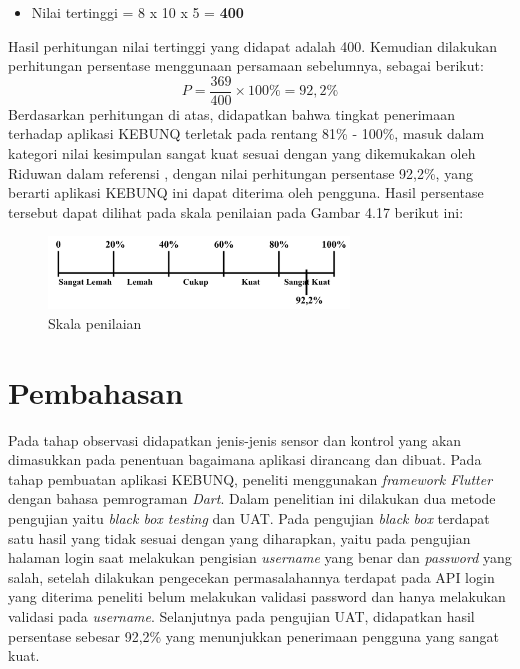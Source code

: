 \begin{flushleft}
\begin{justify}
\begin{itemize}
                \item Nilai tertinggi = 8 x 10 x 5 = \textbf{400}
             \end{itemize}
             Hasil perhitungan nilai tertinggi yang didapat adalah 400. Kemudian dilakukan perhitungan persentase menggunaan persamaan sebelumnya, sebagai berikut:
             \begin{equation}
                P = \frac{369}{400} \times 100\% = 92,2\%
             \end{equation}
             Berdasarkan perhitungan di atas, didapatkan bahwa tingkat penerimaan terhadap aplikasi KEBUNQ terletak pada rentang 81\% - 100\%, 
             masuk dalam kategori nilai kesimpulan sangat kuat sesuai dengan yang dikemukakan oleh Riduwan dalam referensi \cite{kuantitatif}, dengan nilai perhitungan persentase
             92,2\%, yang berarti aplikasi KEBUNQ ini dapat diterima oleh pengguna. Hasil persentase tersebut dapat dilihat pada skala penilaian pada Gambar 4.17 berikut ini:
             \begin{figure}[ht]
                \centering
                \includegraphics[width=8cm]{images/bab 4/persentase.png}
                \caption{Skala penilaian}
            \end{figure}


   
        \section{Pembahasan}
        Pada tahap observasi didapatkan jenis-jenis sensor dan kontrol yang akan dimasukkan pada penentuan bagaimana aplikasi dirancang dan dibuat. Pada tahap pembuatan aplikasi KEBUNQ, peneliti menggunakan \emph{framework Flutter} dengan bahasa pemrograman \emph{Dart}. Dalam penelitian ini dilakukan dua metode pengujian yaitu \emph{black box testing} dan UAT. Pada pengujian \emph{black box} terdapat satu hasil yang tidak sesuai dengan yang diharapkan, yaitu pada
        pengujian halaman login saat melakukan pengisian \emph{username} yang benar dan \emph{password} yang salah, setelah dilakukan pengecekan permasalahannya terdapat pada API login yang diterima peneliti 
        belum melakukan validasi password dan hanya melakukan validasi pada \emph{username}. Selanjutnya pada pengujian UAT, didapatkan hasil persentase sebesar 92,2\% yang menunjukkan penerimaan pengguna yang sangat kuat.
         

    








    \end{justify}




    
\end{flushleft}

\newpage